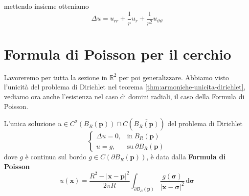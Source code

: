 \documentclass[10pt,a4paper,twoside,openright]{book}
\newcommand{\x}{\mathbf{x}}
\newcommand{\sigg}{\bm{\sigma}}
\newcommand{\de}{\,\mathrm d}
\newcommand{\dsig}{\de \sigg}
\begin{document}
mettendo insieme otteniamo
\begin{equation*}
\Delta u=u_{rr} +\frac{1}{r} u_{r} +\frac{1}{r^{2}} u_{\vartheta \vartheta }
\end{equation*}
\section{Formula di Poisson per il cerchio}
Lavoreremo per tutta la sezione in $\displaystyle \mathbb{R}^{2}$ per poi generalizzare.
Abbiamo visto l'unicità del problema di Dirichlet nel teorema \ref{thm:armoniche-unicita-dirichlet}, vediamo ora anche l'esistenza nel caso di domini radiali, il caso della Formula di Poisson.
\begin{theorem}
L'unica soluzione $u\in C^{2}(B_{R}(\mathbf{p})) \cap C\left(\overline{B_{R}(\mathbf{p})}\right)$ del problema di Dirichlet
\begin{equation*}
\begin{cases}
\Delta u=0, & \text{in} \ B_{R}(\mathbf{p})\\
u=g, & \text{su} \ \partial B_{R}(\mathbf{p})
\end{cases}
\end{equation*}
dove $g$ è continua sul bordo $g\in C(\partial B_{R}(\mathbf{p}))$, è data dalla \textbf{Formula di Poisson}
\begin{equation}
\label{eq:poisson-cerchio}
u(\x) =\frac{R^{2} -| \x-\mathbf{p}| ^{2}}{2\pi R}\int _{\partial B_{R}(\mathbf{p})}\frac{g(\sigg)}{| \x-\sigg | ^{2}} \dsig
\end{equation}
\end{theorem}
\end{document}
